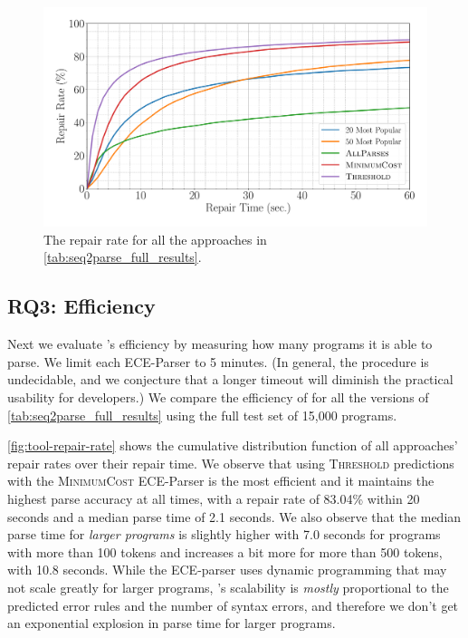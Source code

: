 \begin{figure}[t]
  \centering
  \includegraphics[width=0.85\linewidth]{tool-repair-rate.pdf}
  \caption{The repair rate for all the approaches in
  \autoref{tab:seq2parse_full_results}. }
  \label{fig:tool-repair-rate}
\end{figure}

\subsection{RQ3: Efficiency}
\label{sec:eval:efficiency}

Next we evaluate \toolname's efficiency by measuring how many programs it is
able to parse. We limit each ECE-Parser to 5 minutes. (In general, the procedure
is undecidable, and we conjecture that a longer timeout will diminish the
practical usability for developers.) We compare the efficiency of \toolname for
all the versions of \autoref{tab:seq2parse_full_results} using the full test set
of 15,000 programs.


\autoref{fig:tool-repair-rate} shows the cumulative distribution function of all
\toolname approaches' repair rates over their repair time. We observe that using
\textsc{Threshold} predictions with the \textsc{MinimumCost} ECE-Parser is the
most efficient and it maintains the highest parse accuracy at all times, with a
repair rate of 83.04\% within 20 seconds and a median parse time of 2.1 seconds.
We also observe that the median parse time for \emph{larger programs} is
slightly higher with 7.0 seconds for programs with more than 100 tokens and
increases a bit more for more than 500 tokens, with 10.8 seconds. While the
ECE-parser uses dynamic programming that may not scale greatly for larger
programs, \toolname's scalability is \emph{mostly} proportional to the predicted
error rules and the number of syntax errors, and therefore we don't get an
exponential explosion in parse time for larger programs. 

